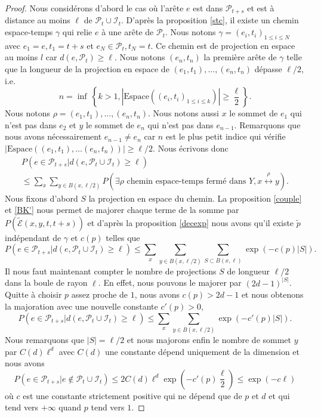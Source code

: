 \documentclass[titlepage,a4paper,12pt]{article}
\newcounter{th}
\newcounter{propo}
\begin{document}
\begin{proof}
Nous considérons d'abord le cas où l'arête $e$ est dans $\mathcal{P}_{t+s}$ et est à distance au moins $\ell$ de $\mathcal{P}_t\cup \mathcal{I}_t$.
D'après la proposition \ref{stc}, il existe un chemin espace-temps $\gamma$ qui relie $e$ à une arête de $\mathcal{P}_t$. Nous notons $\gamma= (e_i,t_i)_{1\leqslant i \leqslant N}$ avec $e_1 = e, t_1 = t+s$ et $e_N\in \mathcal{P}_t, t_N = t$. Ce chemin est de projection en espace au moins $l$ car $d(e,\mathcal{P}_t)\geqslant \ell$. Nous notons $(e_n,t_n)$ la première arête de $\gamma$ telle que la longueur de la projection en espace de $(e_1,t_1),\dots,(e_n,t_n)$ dépasse $\ell/2$, i.e. 
$$ n = \inf\,\left\lbrace k>1, |\mathrm{Espace}((e_i,t_i)_{1\leqslant i \leqslant k})| \geqslant \frac{\ell}{2} \right\rbrace.
$$
Nous notons $\rho = (e_1,t_1),\dots,(e_n,t_n)$. Nous notons aussi $x$ le sommet de $e_1$ qui n'est pas dans $e_2$ et $y$ le sommet de $e_n$ qui n'est pas dans $e_{n-1}$. Remarquons que nous avons nécessairement $e_{n-1} \neq e_n$ car $n$ est le plus petit indice qui vérifie $|\mathrm{Espace}((e_1,t_1),\dots(e_n,t_n))|\geqslant \ell/2$. 
Nous écrivons donc 
\begin{multline*} P(e\in \mathcal{P}_{t+s}|d(e,\mathcal{P}_t\cup \mathcal{I}_t)\geqslant \ell) \\\leqslant \sum_x\sum_{y\in B(x,\ell/2)}P( \exists \rho \text{ chemin espace-temps fermé dans }Y, x\overset{\rho}{\longleftrightarrow} y).
\end{multline*}
Nous fixons d'abord $S$ la projection en espace du chemin. La proposition \ref{couple} et \ref{BK'} nous permet de majorer chaque terme de la somme par $P(\widetilde{\mathcal{E}}(x,y,t,t+s))$ et d'après la proposition \ref{decexp} nous avons qu'il existe $\widetilde{p}$ indépendant de $\gamma$ et $c(p)$ telles que 
$$P(e\in \mathcal{P}_{t+s}|d(e,\mathcal{P}_t\cup \mathcal{I}_t)\geqslant \ell) \leqslant \sum_x\sum_{y\in B(x,\ell/2)}\sum_{S \subset B(x,\ell)} \exp(-c(p)|S|).
$$
Il nous faut maintenant compter le nombre de projections $S$ de longueur $\ell/2$ dans la boule de rayon $\ell$. En effet, nous pouvons le majorer par $(2d-1)^{|S|}$. Quitte à choisir $p$ assez proche de $1$, nous avons $c(p)> 2d-1$ et nous obtenons la majoration avec une nouvelle constante $c'(p) >0$,
$$P(e\in \mathcal{P}_{t+s}|d(e,\mathcal{P}_t\cup \mathcal{I}_t)\geqslant \ell) \leqslant \sum_x\sum_{y\in B(x,\ell/2)} \exp(-c'(p)|S|).
$$
Nous remarquons que $|S| = \ell/2$ et nous majorons enfin le nombre de sommet $y$ par $C(d)\ell^d$ avec $C(d)$ une constante dépend uniquement de la dimension et nous avons 
$$P(e\in \mathcal{P}_{t+s}|e\notin \mathcal{P}_t\cup \mathcal{I}_t) \leqslant 2C(d)\ell^d \exp(-c'(p)\frac{\ell}{2})\leqslant \exp(-c\ell)
$$
où $c$ est une constante strictement positive qui ne dépend que de $p$ et $d$ et qui tend vers $+\infty$ quand $p$ tend vers $1$.


\end{proof}
\end{document}
